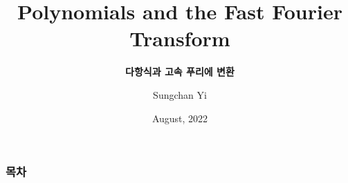 \documentclass[aspectratio=43]{beamer}
\title[Polynomials and the FFT]{\textbf{Polynomials and the Fast Fourier Transform}}
\subtitle{\textbf{다항식과 고속 푸리에 변환}}
\author{Sungchan Yi}
\institute[Backend Engineer]{Scatterlab}
\date[Scatterlab]{August, 2022}
\begin{document}
\frame{\titlepage}

\begin{frame}
  \frametitle{목차}
  \tableofcontents
\end{frame}









\frame{\titlepage}
\end{document}
